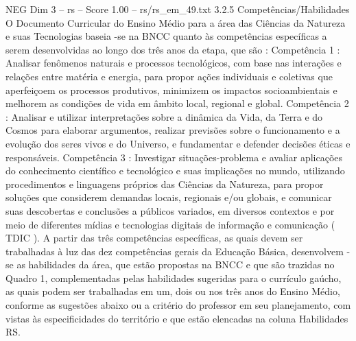 \begin{textsample}{NEG Dim 3 – rs – Score 1.00 – rs/rs\_em\_49.txt}  \label{ex:f3_neg_050}
3.2.5 Competências/Habilidades O Documento Curricular do Ensino Médio para a área das Ciências da Natureza e suas Tecnologias baseia -se na BNCC quanto às competências específicas a serem desenvolvidas ao longo dos três anos da etapa, que são : Competência 1 : Analisar fenômenos naturais e processos tecnológicos, com base nas interações e relações entre matéria e energia, para propor ações individuais e coletivas que aperfeiçoem os processos produtivos, minimizem os impactos socioambientais e melhorem as condições de vida em âmbito local, regional e global.
Competência 2 : Analisar e utilizar interpretações sobre a dinâmica da Vida, da Terra e do Cosmos para elaborar argumentos, realizar previsões sobre o funcionamento e a evolução dos seres vivos e do Universo, e fundamentar e defender decisões éticas e responsáveis.
Competência 3 : Investigar situações-problema e avaliar aplicações do conhecimento científico e tecnológico e suas implicações no mundo, utilizando procedimentos e linguagens próprios das Ciências da Natureza, para propor soluções que considerem demandas locais, regionais e/ou globais, e comunicar suas descobertas e conclusões a públicos variados, em diversos contextos e por meio de diferentes mídias e tecnologias digitais de informação e comunicação ( TDIC ).
A partir das três competências específicas, as quais devem ser trabalhadas à luz das dez competências gerais da Educação Básica, desenvolvem -se as habilidades da área, que estão propostas na BNCC e que são trazidas no Quadro 1, complementadas pelas habilidades sugeridas para o currículo gaúcho, as quais podem ser trabalhadas em um, dois ou nos três anos do Ensino Médio, conforme as sugestões abaixo ou a critério do professor em seu planejamento, com vistas às especificidades do território e que estão elencadas na coluna Habilidades RS.

\end{textsample}
